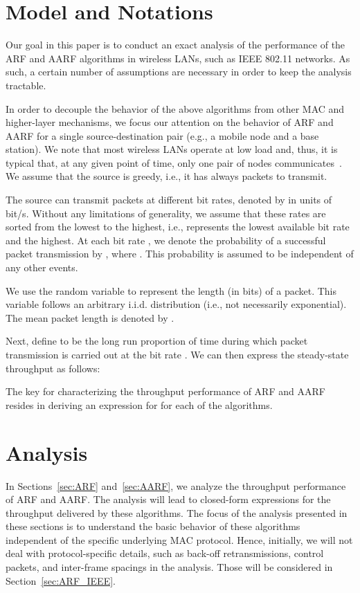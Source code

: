 \documentclass[11pt, journal, letterpaper, oneside, onecolumn]{IEEEtran}
\begin{document}
\section {Model and Notations}
\label{sec:Model and Notations}

Our goal in this paper is to conduct an exact analysis of the
performance of the ARF and AARF algorithms in wireless LANs, such
as IEEE 802.11 networks. As such, a certain number of assumptions
are necessary in order to keep the analysis tractable.

In order to decouple the behavior of the above algorithms from
other MAC and higher-layer mechanisms, we focus our attention on
the behavior of ARF and AARF for a single source-destination pair
(e.g., a mobile node and a base station). We note that most
wireless LANs operate at low load and, thus, it is typical that,
at any given point of time,  only one pair of nodes
communicates~\cite{Traffic}. We assume that the source is greedy,
i.e., it has always packets to transmit.


The source can transmit packets at  different bit rates,
denoted by  in units of bit/s. Without any
limitations of generality, we  assume that these rates are sorted
from the lowest to the highest, i.e.,   represents the
lowest available bit rate and  the highest. At each
bit rate , we denote the probability of a successful packet
transmission by , where . This
probability is assumed to be independent of any other events.

We use the random variable  to represent the length (in
bits) of a packet. This variable follows an arbitrary i.i.d.
distribution (i.e., not necessarily exponential). The mean packet
length is denoted by .




Next, define  to be  the long run proportion of time during
which packet transmission is carried out at the bit rate .
We can then express the steady-state throughput  as follows:

The key for characterizing the throughput performance of ARF and
AARF resides in deriving an expression for  for each of the
algorithms.






\section{Analysis}
\label{sec:analysis}

In Sections~\ref{sec:ARF} and~\ref{sec:AARF},  we analyze the throughput performance of ARF and AARF. The analysis will lead to closed-form expressions for the
throughput delivered by these algorithms. The focus of the
analysis presented in these sections is to understand the basic
behavior of these algorithms independent of the specific underlying
MAC protocol. Hence, initially, we will not deal with protocol-specific
details, such as back-off retransmissions, control packets, and inter-frame spacings in the analysis. Those will be considered in Section~\ref{sec:ARF_IEEE}.
\end{document}
